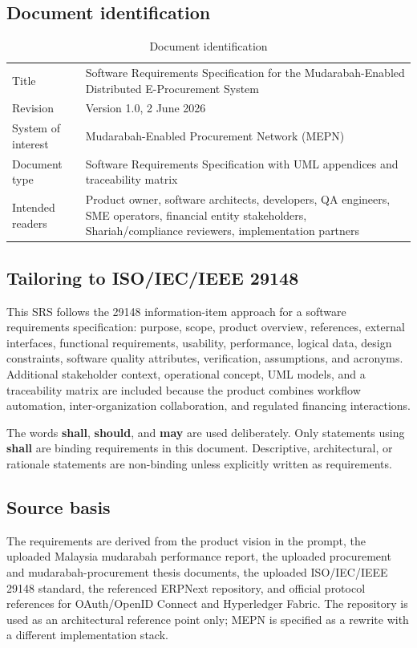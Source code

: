 \documentclass[11pt,a4paper]{article}
\newcommand{\systemname}{Mudarabah-Enabled Procurement Network}
\newcommand{\systemshort}{MEPN}
\newcommand{\must}{\textbf{shall}}
\newcommand{\shouldword}{\textbf{should}}
\newcommand{\mayword}{\textbf{may}}
\begin{document}
\subsection{Document identification}
\begin{table}[h]
\centering
\begin{tabularx}{\textwidth}{@{}lX@{}}
\toprule
Title & Software Requirements Specification for the Mudarabah-Enabled Distributed E-Procurement System \\
Revision & Version 1.0, 2 June 2026 \\
System of interest & \systemname{} (\systemshort{}) \\
Document type & Software Requirements Specification with UML appendices and traceability matrix \\
Intended readers & Product owner, software architects, developers, QA engineers, SME operators, financial entity stakeholders, Shariah/compliance reviewers, implementation partners \\
\bottomrule
\end{tabularx}
\caption{Document identification}
\end{table}

\subsection{Tailoring to ISO/IEC/IEEE 29148}
This SRS follows the 29148 information-item approach for a software requirements specification: purpose, scope, product overview, references, external interfaces, functional requirements, usability, performance, logical data, design constraints, software quality attributes, verification, assumptions, and acronyms. Additional stakeholder context, operational concept, UML models, and a traceability matrix are included because the product combines workflow automation, inter-organization collaboration, and regulated financing interactions.

The words \must{}, \shouldword{}, and \mayword{} are used deliberately. Only statements using \must{} are binding requirements in this document. Descriptive, architectural, or rationale statements are non-binding unless explicitly written as requirements.

\subsection{Source basis}
The requirements are derived from the product vision in the prompt, the uploaded Malaysia mudarabah performance report, the uploaded procurement and mudarabah-procurement thesis documents, the uploaded ISO/IEC/IEEE 29148 standard, the referenced ERPNext repository, and official protocol references for OAuth/OpenID Connect and Hyperledger Fabric. The repository is used as an architectural reference point only; \systemshort{} is specified as a rewrite with a different implementation stack.
\end{document}
